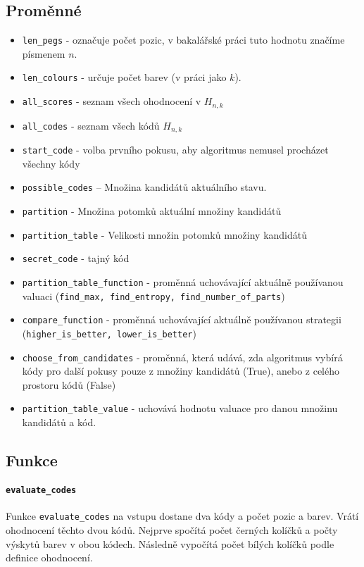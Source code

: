 \documentclass[12pt,a4paper]{article}
\begin{document}
\subsection{Proměnné}
\begin{itemize}
    \item \texttt{len\_pegs} - označuje počet pozic, v bakalářské práci tuto hodnotu značíme písmenem $n$.
    \item \texttt{len\_colours} - určuje počet barev (v práci jako $k$).
    \item \texttt{all\_scores} - seznam všech ohodnocení v $H_{n,k}$
    \item \texttt{all\_codes} - seznam všech kódů $H_{n,k}$
    \item \texttt{start\_code} - volba prvního pokusu, aby algoritmus nemusel procházet všechny kódy
    \item \texttt{possible\_codes} -- Množina kandidátů aktuálního stavu.
    \item \texttt{partition} - Množina potomků aktuální množiny kandidátů
    \item \texttt{partition\_table} - Velikosti množin potomků množiny kandidátů
    \item \texttt{secret\_code} - tajný kód
    \item \texttt{partition\_table\_function} - proměnná uchovávající aktuálně používanou valuaci (\texttt{find\_max, find\_entropy, find\_number\_of\_parts})
    \item \texttt{compare\_function} - proměnná uchovávající aktuálně používanou strategii (\texttt{higher\_is\_better, lower\_is\_better})
    \item \texttt{choose\_from\_candidates} - proměnná, která udává, zda algoritmus vybírá kódy pro další pokusy pouze z množiny kandidátů (True), anebo z celého prostoru kódů (False)
    \item \texttt{partition\_table\_value} - uchovává hodnotu valuace pro danou množinu kandidátů a kód.
\end{itemize}



\subsection{Funkce}

\paragraph{\texttt{evaluate\_codes}}
Funkce \texttt{evaluate\_codes} na vstupu dostane dva kódy a počet pozic a barev. Vrátí ohodnocení těchto dvou kódů. Nejprve spočítá počet černých kolíčků a počty výskytů barev v obou kódech. Následně vypočítá počet bílých kolíčků podle definice ohodnocení. 
\end{document}
